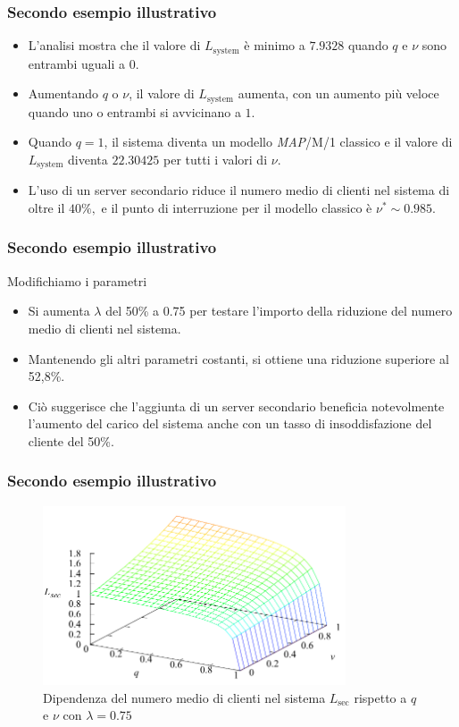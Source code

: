 \documentclass{beamer}
\begin{document}
\begin{frame}
    \frametitle{Secondo esempio illustrativo}
    \begin{itemize}
        \item L'analisi mostra che il valore di $L_\mathrm{system}$ è minimo a $7.9328$ quando $q$ e $\nu$ sono entrambi uguali a $0$.
        \item Aumentando $q$ o $\nu$, il valore di $L_\mathrm{system}$ aumenta, con un aumento più veloce quando uno o entrambi si avvicinano a $1$.
        \item Quando $q=1$, il sistema diventa un modello \emph{MAP}/M/1 classico e il valore di $L_\mathrm{system}$ diventa $22.30425$ per tutti i valori di $\nu$.
        \item L'uso di un server secondario riduce il numero medio di clienti nel sistema di oltre il $40\%,$ e il punto di interruzione per il modello classico è $\nu^* \sim 0.985$.
    \end{itemize}
\end{frame}


\begin{frame}
    \frametitle{Secondo esempio illustrativo}
\begin{block}{Modifichiamo i parametri}
        \begin{itemize}
            \item Si aumenta $\lambda$ del 50\% a 0.75 per testare l'importo della riduzione del numero medio di clienti nel sistema.
            \item Mantenendo gli altri parametri costanti, si ottiene una riduzione superiore al 52,8\%.
            \item Ciò suggerisce che l'aggiunta di un server secondario beneficia notevolmente l'aumento del carico del sistema anche con un tasso di insoddisfazione del cliente del 50\%.
        \end{itemize}
\end{block}
\end{frame}


\begin{frame}
    \frametitle{Secondo esempio illustrativo}
    \begin{figure}[h]
        \centering
        \includegraphics[width=0.8\textwidth]{0uFWo7C.png}
        \caption{ Dipendenza del numero medio di clienti nel sistema $L_{\mathrm{sec}}$ rispetto a $q$ e $\nu$ con $\lambda=0.75$}
    \end{figure}
\end{frame}
\end{document}
